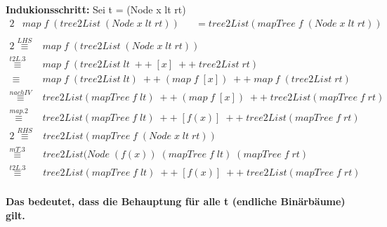 \documentclass[11pt]{article}
\begin{document}
\begin{enumerate}
\newpage
\textbf{Indukionsschritt:} Sei t = (Node x lt rt)
\begin{alignat*}{2}
&map\phantom{.}f\phantom{.}(tree2List\phantom{.}(Node\phantom{.}x\phantom{.}lt\phantom{.}rt))&&=tree2List(mapTree\phantom{.}f\phantom{.}(Node\phantom{.}x\phantom{.}lt\phantom{.}rt))\\
\end{alignat*}
\begin{alignat*}{2}
\stackrel{LHS}{\equiv}&map\phantom{.}f\phantom{.}(tree2List\phantom{.}(Node\phantom{.}x\phantom{.}lt\phantom{.}rt))\\
\stackrel{t2L.3}{\equiv}&map\phantom{.}f\phantom{.}(tree2List\phantom{.}lt\phantom{.}++\phantom{.}[x]\phantom{.}++\phantom{.}tree2List\phantom{.}rt)\\
\equiv\phantom{.}&map\phantom{.}f\phantom{.}(tree2List\phantom{.}lt)\phantom{.}++\phantom{.}(map\phantom{.}f\phantom{.}[x])\phantom{.}++\phantom{.}map\phantom{.}f\phantom{.}(tree2List\phantom{.}rt)\\
\stackrel{nach IV}{\equiv}&tree2List(mapTree\phantom{.}f\phantom{.}lt)\phantom{.}++\phantom{.}(map\phantom{.}f\phantom{.}[x])\phantom{.}++\phantom{.}tree2List(mapTree\phantom{.}f\phantom{.}rt)\\
\stackrel{map.2}{\equiv}&tree2List(mapTree\phantom{.}f\phantom{.}lt)\phantom{.}++\phantom{.}[f(x)]\phantom{.}++\phantom{.}tree2List(mapTree\phantom{.}f\phantom{.}rt)
\end{alignat*}
\begin{alignat*}{2}
\stackrel{RHS}{\equiv}&tree2List(mapTree\phantom{.}f\phantom{.}(Node\phantom{.}x\phantom{.}lt\phantom{.}rt))\\
\stackrel{mT.3}{\equiv}&tree2List(Node\phantom{.}(f(x))\phantom{.}(mapTree\phantom{.}f\phantom{.}lt)\phantom{.}(mapTree\phantom{.}f\phantom{.}rt)\\
\stackrel{t2L.3}{\equiv}&tree2List(mapTree\phantom{.}f\phantom{.}lt)\phantom{.}++\phantom{.}[f(x)]\phantom{.}++\phantom{.}tree2List(mapTree\phantom{.}f\phantom{.}rt)\phantom{......}\\
\end{alignat*}

\vspace*{0.5cm}
\textbf{Das bedeutet, dass die Behauptung für alle t (endliche Binärbäume) gilt.}


\end{enumerate}
\end{document}
